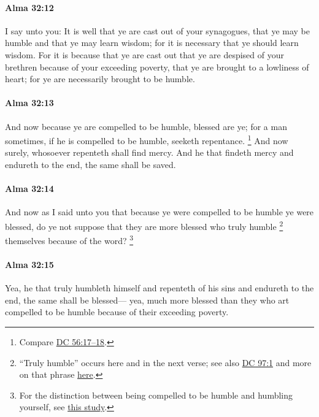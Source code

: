 		\paragraph{Alma 32:12} %
			\label{ALMA-32-12}

			I say unto you:
			It is well that ye are cast out of your synagogues,
			that ye may be humble and that ye may learn wisdom;
			for it is necessary that ye should learn wisdom.
			For it is because that ye are cast out
			that ye are despised of your brethren because of your exceeding poverty,
			that ye are brought to a lowliness of heart;
			for ye are necessarily brought to be humble.

		\paragraph{Alma 32:13} %
			\label{ALMA-32-13}

			And now because ye are compelled to be humble, blessed are ye;
			for a man sometimes, if he is compelled to be humble, seeketh repentance.%
				\footnote{%
					Compare \hyperref[DC56-17]{DC 56:17--18}.
					}
			And now surely, whosoever repenteth shall find mercy.
			And he that findeth mercy and endureth to the end,
			the same shall be saved.

		\paragraph{Alma 32:14} %
			\label{ALMA-32-14}

			And now as I said unto you
			that because ye were compelled to be humble ye were blessed,
			do ye not suppose that they are more blessed
			who truly humble%
				\footnote{%
					``Truly humble'' occurs here and in the next verse; see also \hyperref[DC97-1]{DC 97:1} and more on that phrase \hyperref[HUMILITY-PHRASES]{here}.
					}
			themselves because of the word?%
				\footnote{%
					For the distinction between being compelled to be humble and humbling yourself, see \hyperref[HUMILITY-yourself]{this study}.
					}

		\paragraph{Alma 32:15} %
			\label{ALMA-32-15}

			Yea, he that truly humbleth himself
			and repenteth of his sins and endureth to the end,
			the same shall be blessed---
			yea, much more blessed than they who art compelled to be humble
			because of their exceeding poverty.

